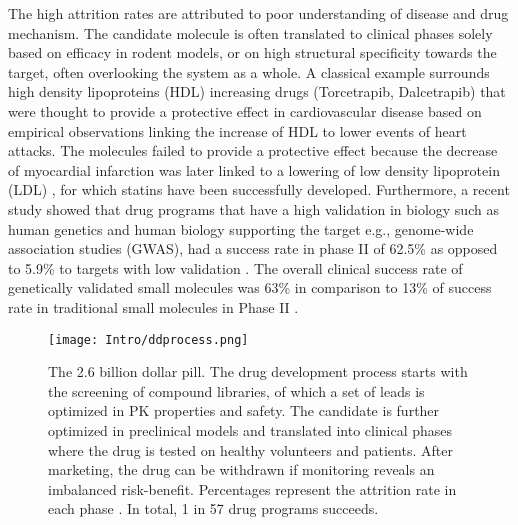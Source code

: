 The high attrition rates are attributed to poor understanding of disease and drug mechanism. The candidate molecule is often translated to clinical phases solely based on efficacy in rodent models, or on high structural specificity towards the target, often overlooking the system as a whole. A classical example surrounds high density lipoproteins (HDL) increasing drugs (Torcetrapib, Dalcetrapib) that were thought to provide a protective effect in cardiovascular disease based on empirical observations linking the increase of HDL to lower events of heart attacks. The molecules failed to provide a protective effect because the decrease of myocardial infarction was later linked to a lowering of low density lipoprotein (LDL) \cite{voight2012plasma}, for which statins have been successfully developed. Furthermore, a recent study showed that drug programs that have a high validation in biology such as human genetics and human biology supporting the target e.g., genome-wide association studies (GWAS), had a success rate in phase II of 62.5\% as opposed to 5.9\% to targets with low validation\cite{keseru2009influence} \cite{hubbard2006structure}. The overall clinical success rate of genetically validated small molecules was  63\% in comparison to 13\% of success rate in traditional small molecules in Phase II \cite{ringel2013does}.\\
\begin{figure}[!ht]
\centering
	\texttt{[image: Intro/ddprocess.png]}%
	\caption[The 2.6 billion dollar pill.]{The 2.6 billion dollar pill. The drug development process starts with the screening of compound libraries, of which a set of leads is optimized in PK properties and safety. The candidate is further optimized in preclinical models and translated into clinical phases where the drug is tested on healthy volunteers and patients. After marketing, the drug can be withdrawn if monitoring reveals an imbalanced risk-benefit. Percentages represent the attrition rate in each phase \cite{cook2014lessons}. In total, 1 in 57 drug programs succeeds.}
	\label{fig:ddprocess}
\end{figure}
